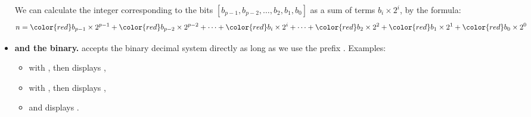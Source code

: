 \documentclass[11pt,class=report,crop=false]{standalone}
\begin{document}
\begin{cours}[Binary]
\begin{itemize}
We can calculate the integer corresponding to the bits $[b_{p-1},b_{p-2}, \ldots,b_2,b_1,b_0]$ as a sum of terms $b_i \times 2^i$, by the formula:
$$n = {\color{red}b_{p-1}} \times 2^{p-1} + {\color{red}b_{p-2}} \times 2^{p-2} + \cdots + {\color{red}b_i} \times 2^i +  \cdots + {\color{red}b_2} \times 2^2 + {\color{red}b_1} \times 2^1 + {\color{red}b_0} \times 2^0$$
  
    \item \textbf{\Python{} and the binary.} \Python{} accepts the binary decimal system directly as long as we use the prefix \og{}\fg{}.
    Examples:
    \begin{itemize}
      \item with , then  displays ,
      \item with , then  displays ,
      \item and  displays .
    \end{itemize} 
 \end{itemize}     

\end{cours}


\end{document}
